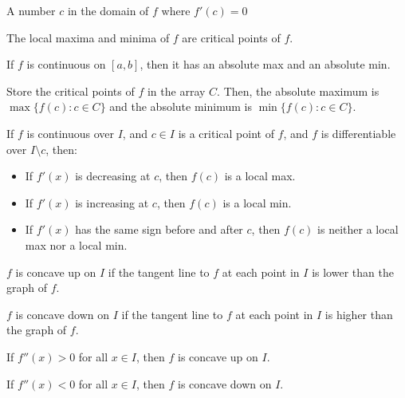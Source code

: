 \begin{definition}
  A number $c$ in the domain of $f$ where $f'(c) = 0$
\end{definition}

\begin{namedtheorem}
  The local maxima and minima of $f$ are critical points of $f$.
\end{namedtheorem}

\begin{namedtheorem}
  If $f$ is continuous on $[a, b]$, then it has an absolute max and an absolute min.
\end{namedtheorem}

\begin{theorem}
  Store the critical points of $f$ in the array $C$. Then, the absolute maximum is $\max \{f(c) : c \in C\}$ and the absolute minimum is $\min \{f(c) : c \in C\}$.
\end{theorem}

\begin{theorem}
  If $f$ is continuous over $I$, and $c \in I$ is a critical point of $f$, and $f$ is differentiable over $I \setminus {c}$, then:

  \begin{itemize}
    \item If $f'(x)$ is decreasing at $c$, then $f(c)$ is a local max.
    \item If $f'(x)$ is increasing at $c$, then $f(c)$ is a local min.
    \item If $f'(x)$ has the same sign before and after $c$, then $f(c)$ is neither a local max nor a local min.
  \end{itemize}
\end{theorem}

\begin{definition}[Concavity]
  $f$ is concave up on $I$ if the tangent line to $f$ at each point in $I$ is lower than the graph of $f$.

  $f$ is concave down on $I$ if the tangent line to $f$ at each point in $I$ is higher than the graph of $f$.
\end{definition}

\begin{theorem}
  If $f''(x) > 0$ for all $x \in I$, then $f$ is concave up on $I$.

  If $f''(x) < 0$ for all $x \in I$, then $f$ is concave down on $I$.
\end{theorem}

